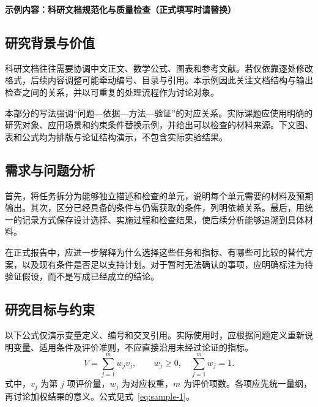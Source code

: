 \noindent\textbf{示例内容：科研文档规范化与质量检查（正式填写时请替换）}\par

\subsection{研究背景与价值}
科研文档往往需要协调中文正文、数学公式、图表和参考文献。若仅依靠逐处修改格式，后续内容调整可能牵动编号、目录与引用。本示例因此关注文档结构与输出检查之间的关系，并以可重复的处理流程作为讨论对象。

本部分的写法强调“问题—依据—方法—验证”的对应关系。实际课题应使用明确的研究对象、应用场景和约束条件替换示例，并给出可以检查的材料来源。下文图、表和公式均为排版与论证结构演示，不包含实际实验结果。

\subsection{需求与问题分析}
首先，将任务拆分为能够独立描述和检查的单元，说明每个单元需要的材料及预期输出。其次，区分已经具备的条件与仍需获取的条件，列明依赖关系。最后，用统一的记录方式保存设计选择、实施过程和检查结果，使后续分析能够追溯到具体材料。

在正式报告中，应进一步解释为什么选择这些任务和指标、有哪些可比较的替代方案，以及现有条件是否足以支持计划。对于暂时无法确认的事项，应明确标注为待验证假设，而不是写成已经成立的结论。

\subsection{研究目标与约束}
以下公式仅演示变量定义、编号和交叉引用。实际使用时，应根据问题定义重新说明变量、适用条件及评价准则，不应直接沿用未经过论证的指标。
\begin{equation}\label{eq:sample-1}
V=\sum_{j=1}^{m}w_jv_j,\qquad w_j\geq0,\quad\sum_{j=1}^{m}w_j=1.
\end{equation}
式中，$v_j$ 为第 $j$ 项评价量，$w_j$ 为对应权重，$m$ 为评价项数。各项应先统一量纲，再讨论加权结果的意义。公式见式~\eqref{eq:sample-1}。

